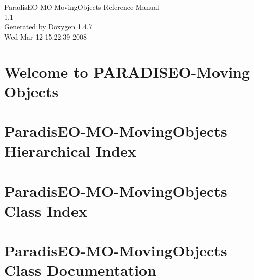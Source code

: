 \documentclass[a4paper]{book}
\begin{document}
\begin{titlepage}
\vspace*{7cm}
\begin{center}
{\Large Paradis\-EO-MO-Moving\-Objects Reference Manual\\[1ex]\large 1.1 }\\
\vspace*{1cm}
{\large Generated by Doxygen 1.4.7}\\
\vspace*{0.5cm}
{\small Wed Mar 12 15:22:39 2008}\\
\end{center}
\end{titlepage}
\clearemptydoublepage
{}
\tableofcontents
\clearemptydoublepage
{}
\chapter{Welcome to PARADISEO-Moving Objects }
\label{index}
\chapter{Paradis\-EO-MO-Moving\-Objects Hierarchical Index}

\chapter{Paradis\-EO-MO-Moving\-Objects Class Index}

\chapter{Paradis\-EO-MO-Moving\-Objects Class Documentation}




































\printindex
\end{document}
